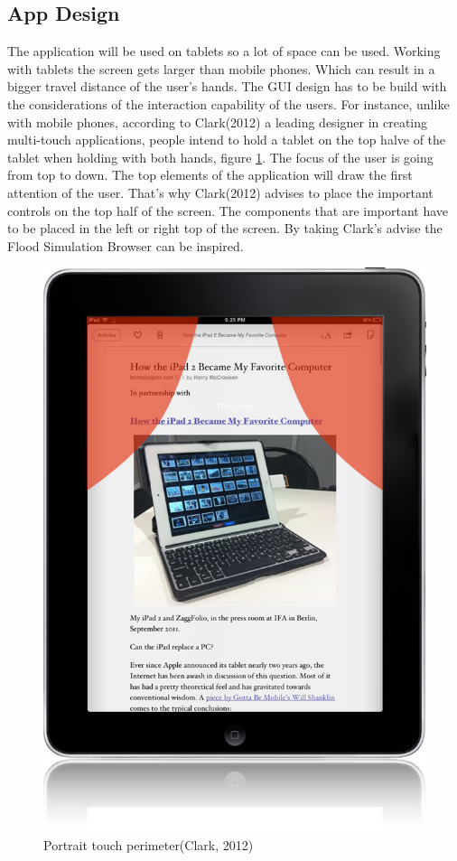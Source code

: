 \subsection{App Design} 
\label{sec:appdesign}
The application will be used on tablets so a lot of space can be used. Working with tablets the screen gets larger than mobile phones. Which can result in a bigger travel distance of the user's hands. The GUI design has to be build with the considerations of the interaction capability of the users. For instance, unlike with mobile phones, according to Clark(2012) a leading designer in creating multi-touch applications, people intend to hold a tablet on the top halve of the tablet when holding with both hands, figure \ref{fig:perimeter}. The focus of the user is going from top to down. The top elements of the application will draw the first attention of the user. That's why Clark(2012) advises to place the important controls on the top half of the screen. The components that are important have to be placed in the left or right top of the screen. By taking Clark's advise the Flood Simulation Browser can be inspired.
\begin{figure}[h!]
\center
\includegraphics[scale=0.3]{touch.png}
\caption{Portrait touch perimeter(Clark, 2012)}
\label{fig:perimeter}
\end{figure}
